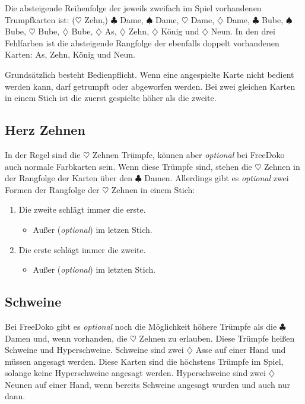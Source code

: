 \documentclass{scrartcl}
\newcommand{\kreuz}{$\clubsuit$\xspace}
\newcommand{\pik}{$\spadesuit$\xspace}
\newcommand{\herz}{$\heartsuit$\xspace}
\newcommand{\karo}{$\diamondsuit$\xspace}
\newcommand{\optional}{\textit{optional}\xspace}
\begin{document}
Die absteigende Reihenfolge der jeweils zweifach im Spiel vorhandenen Trumpfkarten ist: (\herz Zehn,) \kreuz Dame, \pik Dame, \herz Dame, \karo Dame, \kreuz Bube, \pik Bube, \herz Bube, \karo Bube, \karo As, \karo Zehn, \karo König und \karo Neun. In den drei Fehlfarben ist die absteigende Rangfolge der ebenfalls doppelt vorhandenen Karten: As, Zehn, König und Neun.

Grundsätzlich besteht Bedienpflicht. Wenn eine angespielte Karte nicht bedient werden kann, darf getrumpft oder abgeworfen werden.  Bei zwei gleichen Karten in einem Stich ist die zuerst gespielte höher als die zweite.

\subsection{Herz Zehnen}
In der Regel sind die \herz Zehnen Trümpfe, können aber \optional bei FreeDoko auch normale Farbkarten sein. Wenn diese Trümpfe sind, stehen die \herz Zehnen in der Rangfolge der Karten über den \kreuz Damen. Allerdings gibt es \optional zwei Formen der Rangfolge der \herz Zehnen in einem Stich:
\begin{enumerate}
  \item Die zweite schlägt immer die erste.
    \begin{itemize}
      \item Außer (\optional) im letzen Stich.
    \end{itemize}
  \item Die erste schlägt immer die zweite.
    \begin{itemize}
      \item Außer (\optional) im letzten Stich.
    \end{itemize}
\end{enumerate}

\subsection{Schweine}
Bei FreeDoko gibt es \optional noch die Möglichkeit höhere Trümpfe als die \kreuz Damen und, wenn vorhanden, die \herz Zehnen zu erlauben. Diese Trümpfe heißen Schweine und Hyperschweine. Schweine sind zwei \karo Asse auf einer Hand und müssen angesagt werden. Diese Karten sind die höchstens Trümpfe im Spiel, solange keine Hyperschweine angesagt werden. Hyperschweine sind zwei \karo Neunen auf einer Hand, wenn bereits Schweine angesagt wurden und auch nur dann.
\end{document}
